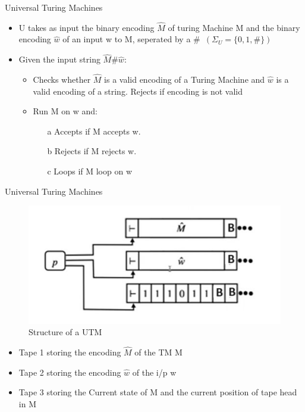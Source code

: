 \documentclass{beamer}
\begin{document}
\begin{frame}{Universal Turing Machines}
\begin{itemize}
	\item U takes as input the binary encoding $\hat{M}$ of turing Machine M and the binary encoding $\hat{w}$ of an input w to M, seperated by a $\#$\  $(\Sigma_U = \{0,1,\#\})$
	\item Given the input string $\hat{M}\#\hat{w}$:
	\begin{itemize}
		\item Checks whether $\hat{M}$ is a valid encoding of a Turing Machine and $\hat{w}$ is a valid encoding of a string. Rejects if encoding is not valid
		\item Run M on w and:
		\begin{itemize}
			\item[a] Accepts if M accepts w.
			\item[b] Rejects if M rejects w.
			\item[c] Loops if M loop on w
		\end{itemize}
	\end{itemize}
\end{itemize}
\end{frame}
\begin{frame}{Universal Turing Machines}
		\begin{figure}
		\includegraphics[scale=.75]{img5/m25}
		\caption{Structure of a UTM}
	\end{figure}
\begin{itemize}
	\item Tape 1 storing the encoding $\hat{M}$ of the TM M
	\item Tape 2 storing the encoding $\hat{w}$ of the i/p w
	\item Tape 3 storing the Current state of M and the current position of tape head in M
\end{itemize}
\end{frame}
\end{document}
